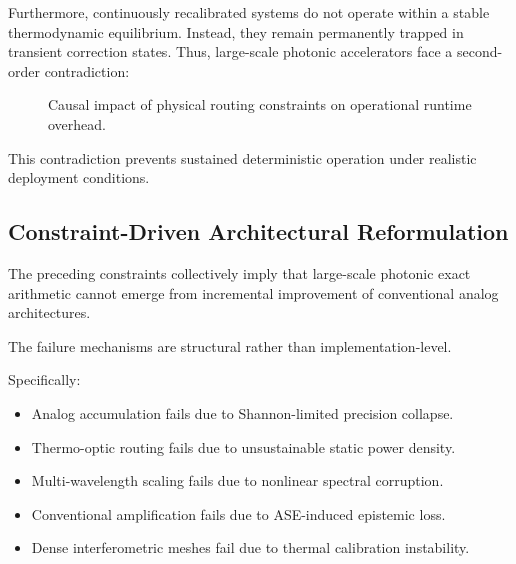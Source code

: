 \documentclass[journal]{IEEEtran}
\begin{document}
Furthermore, continuously recalibrated systems do not operate within a stable thermodynamic equilibrium. Instead, they remain permanently trapped in transient correction states. Thus, large-scale photonic accelerators face a second-order contradiction:

\begin{figure}[htbp]
\centering
{}
\caption{Causal impact of physical routing constraints on operational runtime overhead.}
\label{fig:causal_routing}
\end{figure}

This contradiction prevents sustained deterministic operation under realistic deployment conditions.

\subsection{\textbf{Constraint-Driven Architectural Reformulation}}

The preceding constraints collectively imply that large-scale photonic exact arithmetic cannot emerge from incremental improvement of conventional analog architectures.

The failure mechanisms are structural rather than implementation-level.

Specifically:

\begin{itemize}
\item  Analog accumulation fails due to Shannon-limited precision collapse.
\item  Thermo-optic routing fails due to unsustainable static power density.
\item  Multi-wavelength scaling fails due to nonlinear spectral corruption.
\item  Conventional amplification fails due to ASE-induced epistemic loss.
\item  Dense interferometric meshes fail due to thermal calibration instability.
\end{itemize}
\end{document}
